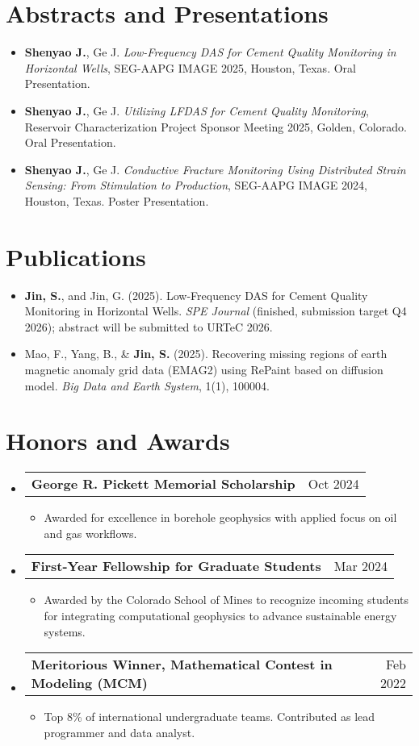 \documentclass[letterpaper,13pt]{article}
\makeatletter
\newcommand{\resumeItem}[1]{\item\small{{#1 \vspace{-2pt}}}}
\newcommand{\resumeProjectHeading}[2]{
    \item
    \begin{tabular*}{0.97\textwidth}{l@{\extracolsep{\fill}}r}
      \small#1 & #2 \\
    \end{tabular*}\vspace{-7pt}
}
\newcommand{\resumeItemListStart}{\begin{itemize}[label={\small$\bullet$}]}
\newcommand{\resumeItemListEnd}{\end{itemize}\vspace{-5pt}}
\newcommand{\resumeSubHeadingListStart}{\begin{itemize}[leftmargin=0.15in, label={}]}
\newcommand{\resumeSubHeadingListEnd}{\end{itemize}}
\makeatother
\begin{document}
\section{Abstracts and Presentations}
\resumeSubHeadingListStart
  \resumeItem{\textbf{Shenyao J.}, Ge J. \textit{Low-Frequency DAS for Cement Quality Monitoring in Horizontal Wells}, SEG-AAPG IMAGE 2025, Houston, Texas. Oral Presentation.}
  \resumeItem{\textbf{Shenyao J.}, Ge J. \textit{Utilizing LFDAS for Cement Quality Monitoring}, Reservoir Characterization Project Sponsor Meeting 2025, Golden, Colorado. Oral Presentation.}
  \resumeItem{\textbf{Shenyao J.}, Ge J. \textit{Conductive Fracture Monitoring Using Distributed Strain Sensing: From Stimulation to Production}, SEG-AAPG IMAGE 2024, Houston, Texas. Poster Presentation.}
\resumeSubHeadingListEnd



\section{Publications}
\resumeSubHeadingListStart
  \resumeItem{\textbf{Jin, S.}, and Jin, G. (2025). Low-Frequency DAS for Cement Quality Monitoring in Horizontal Wells. \textit{SPE Journal} (finished, submission target Q4 2026); abstract will be submitted to URTeC 2026.}
  \resumeItem{Mao, F., Yang, B., & \textbf{Jin, S.} (2025). Recovering missing regions of earth magnetic anomaly grid data (EMAG2) using RePaint based on diffusion model. \textit{Big Data and Earth System}, 1(1), 100004.}
\resumeSubHeadingListEnd


\section{Honors and Awards}
\resumeSubHeadingListStart

\resumeProjectHeading
  {\textbf{George R. Pickett Memorial Scholarship}}{Oct 2024}
\resumeItemListStart
  \resumeItem{Awarded for excellence in borehole geophysics with applied focus on oil and gas workflows.}
\resumeItemListEnd

\resumeProjectHeading
  {\textbf{First-Year Fellowship for Graduate Students}}{Mar 2024}
\resumeItemListStart
  \resumeItem{Awarded by the Colorado School of Mines to recognize incoming students for integrating computational geophysics to advance sustainable energy systems.}
\resumeItemListEnd

\resumeProjectHeading
  {\textbf{Meritorious Winner, Mathematical Contest in Modeling (MCM)}}{Feb 2022}
\resumeItemListStart
  \resumeItem{Top 8\% of international undergraduate teams. Contributed as lead programmer and data analyst.}
\resumeItemListEnd

\resumeSubHeadingListEnd
\end{document}
